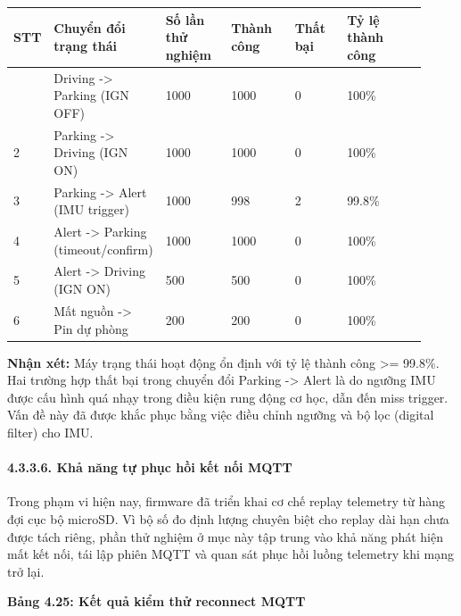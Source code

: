\documentclass[13pt,a4paper]{extarticle}
\newcounter{none} %
\newcommand{\thesislongtableorignewline}{}
\let\thesislongtableorignewline\\
\renewcommand{\\}{\thesislongtableorignewline\hline}%
\let\\\thesislongtableorignewline
\newcommand{\thesistabletitle}[1]{%
  \begin{center}\textbf{#1}\end{center}%
}
\begin{document}
{\def\LTcaptype{none} %
\begin{longtable}{|p{0.06\linewidth}|p{0.14\linewidth}|p{0.17\linewidth}|p{0.17\linewidth}|p{0.14\linewidth}|p{0.24\linewidth}|}
\hline \textbf{STT} & \textbf{Chuyển đổi trạng thái} & \textbf{Số lần thử nghiệm} & \textbf{Thành công} & \textbf{Thất bại} & \textbf{Tỷ lệ thành công} \\
\hline
\endhead
\hline
\endlastfoot
1 & Driving -\textgreater{} Parking (IGN OFF) & 1000 & 1000 & 0 &
100\% \\
2 & Parking -\textgreater{} Driving (IGN ON) & 1000 & 1000 & 0 &
100\% \\
3 & Parking -\textgreater{} Alert (IMU trigger) & 1000 & 998 & 2 &
99.8\% \\
4 & Alert -\textgreater{} Parking (timeout/confirm) & 1000 & 1000 & 0 &
100\% \\
5 & Alert -\textgreater{} Driving (IGN ON) & 500 & 500 & 0 & 100\% \\
6 & Mất nguồn -\textgreater{} Pin dự phòng & 200 & 200 & 0 & 100\% \\
\end{longtable}
}

\textbf{Nhận xét:} Máy trạng thái hoạt động ổn định với tỷ lệ thành công
\textgreater= 99.8\%. Hai trường hợp thất bại trong chuyển đổi Parking
-\textgreater{} Alert là do ngưỡng IMU được cấu hình quá nhạy trong điều
kiện rung động cơ học, dẫn đến miss trigger. Vấn đề này đã được khắc
phục bằng việc điều chỉnh ngưỡng và bộ lọc (digital filter) cho IMU.

\paragraph{4.3.3.6. Khả năng tự phục hồi kết nối
MQTT}\label{4336-khux1ea3-nux103ng-tux1ef1-phux1ee5c-hux1ed3i-kux1ebft-nux1ed1i-mqtt}

Trong phạm vi hiện nay, firmware đã triển khai cơ chế replay telemetry
từ hàng đợi cục bộ microSD. Vì bộ số đo định lượng chuyên biệt cho
replay dài hạn chưa được tách riêng, phần thử nghiệm ở mục này tập trung
vào khả năng phát hiện mất kết nối, tái lập phiên MQTT và quan sát phục
hồi luồng telemetry khi mạng trở lại.

\thesistabletitle{Bảng 4.25: Kết quả kiểm thử reconnect MQTT}
\end{document}
